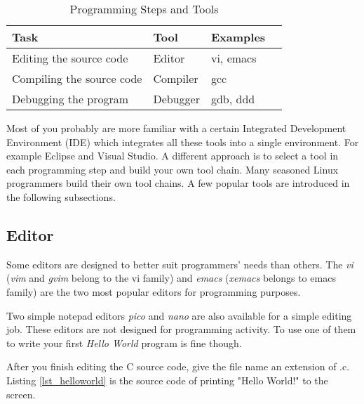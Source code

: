 \begin{table}[ht]
\begin{center}
\begin{tabular}{llll}
\hline
Task & Tool & Examples\\ \hline
Editing the source code &    Editor & vi, emacs\\  
Compiling the source code &  Compiler & gcc \\ 
Debugging the program	  &  Debugger & gdb, ddd \\ \hline 
\end{tabular}
\caption{Programming Steps and Tools}
\label{tb_prog_tools}
\end{center}
\end{table}

Most of you probably are more familiar with a certain Integrated Development Environment (IDE) which integrates all these tools into a single environment. For example Eclipse and Visual Studio. A different approach is to select a tool in each programming step and build your own tool chain. Many seasoned Linux programmers build their own tool chains. A few popular tools are introduced in the following subsections.

\subsection{Editor}

Some editors are designed to better suit programmers' needs than others. The {\em vi} ({\em vim} and {\em gvim} belong to the vi family) and {\em emacs} ({\em xemacs} belongs to emacs family) are the two most popular editors for programming purposes.


Two simple notepad editors {\em pico} and {\em nano} are also available for a simple editing job. These editors are not designed for programming activity. To use one of them to write your first {\em Hello World} program is fine though. 

After you finish editing the C source code, give the file name an extension of .c. Listing \ref{lst_helloworld} is the source code of printing "Hello World!" to the screen. 



